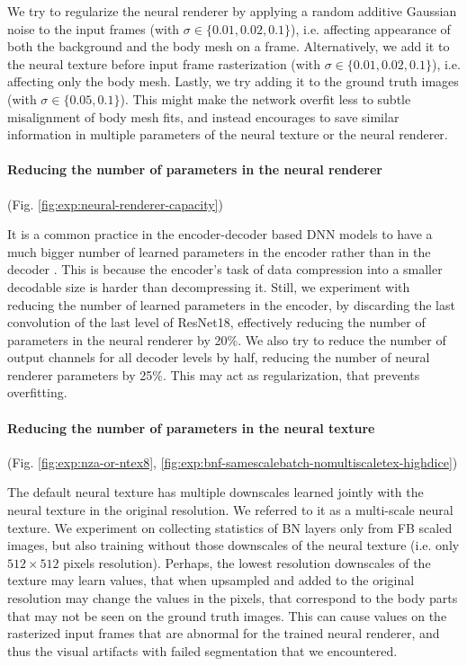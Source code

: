 We try to regularize the neural renderer by applying a random additive Gaussian noise to the input frames (with $\sigma\in\{0.01, 0.02, 0.1\}$), i.e. affecting appearance of both the background and the body mesh on a frame. Alternatively, we add it to the neural texture before input frame rasterization (with $\sigma\in\{0.01, 0.02, 0.1\}$), i.e. affecting only the body mesh. Lastly, we try adding it to the ground truth images (with $\sigma\in\{0.05, 0.1\}$). This might make the network overfit less to subtle misalignment of body mesh fits, and instead encourages to save similar information in multiple parameters of the neural texture or the neural renderer.

\vspace{-15pt}\paragraph{Reducing the number of parameters in the neural renderer}(Fig. \ref{fig:exp:neural-renderer-capacity})\mbox{}\nopagebreak

It is a common practice in the encoder-decoder based DNN models to have a much bigger number of learned parameters in the encoder rather than in the decoder \cite{dnn:resnet-unet20, dnn:relightable-pointcloud20, dnn:neuralpointgraphics20}. This is because the encoder's task of data compression into a smaller decodable size is harder than decompressing it. Still, we experiment with reducing the number of learned parameters in the encoder, by discarding the last convolution of the last level of ResNet18, effectively reducing the number of parameters in the neural renderer by 20\%. We also try to reduce the number of output channels for all decoder levels by half, reducing the number of neural renderer parameters by 25\%. This may act as regularization, that prevents overfitting.

\vspace{-15pt}\paragraph{Reducing the number of parameters in the neural texture}(Fig. \ref{fig:exp:nza-or-ntex8}, \ref{fig:exp:bnf-samescalebatch-nomultiscaletex-highdice})\mbox{}\nopagebreak

The default neural texture has multiple downscales learned jointly with the neural texture in the original resolution. We referred to it as a multi-scale neural texture. We experiment on collecting statistics of BN layers only from FB scaled images, but also training without those downscales of the neural texture (i.e. only $512 \times 512$ pixels resolution). Perhaps, the lowest resolution downscales of the texture may learn values, that when upsampled and added to the original resolution may change the values in the pixels, that correspond to the body parts that may not be seen on the ground truth images. This can cause values on the rasterized input frames that are abnormal for the trained neural renderer, and thus the visual artifacts with failed segmentation that we encountered.

